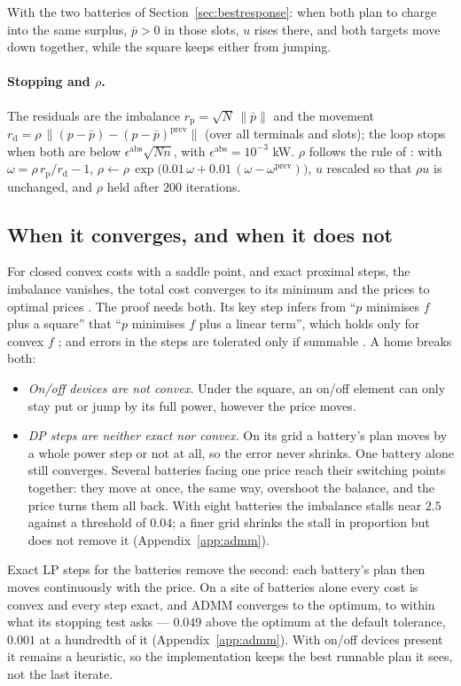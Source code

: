 \documentclass[11pt,a4paper]{article}
\begin{document}
With the two batteries of Section~\ref{sec:bestresponse}: when both plan to
charge into the same surplus, $\bar p > 0$ in those slots, $u$ rises there, and
both targets move down together, while the square keeps either from jumping.

\paragraph{Stopping and $\rho$.} The residuals are the imbalance
$r_{\mathrm p} = \sqrt N\,\|\bar p\|$ and the movement
$r_{\mathrm d} = \rho\,\|(p - \bar p) - (p - \bar p)^{\mathrm{prev}}\|$ (over all
terminals and slots); the loop stops when both are below $\epsilon^{\mathrm{abs}}\sqrt{Nn}$,
with $\epsilon^{\mathrm{abs}} = 10^{-3}$ kW.
$\rho$ follows the rule of \cite{kraning2014}: with $\omega = \rho\, r_{\mathrm p}/r_{\mathrm d} - 1$,
$\rho \leftarrow \rho\,\exp\!\big(0.01\,\omega + 0.01\,(\omega -
\omega^{\mathrm{prev}})\big)$, $u$ rescaled so that $\rho u$ is unchanged, and
$\rho$ held after $200$ iterations.

\subsection{When it converges, and when it does not}
\label{sec:convergence}

For closed convex costs with a saddle point, and exact proximal steps, the
imbalance vanishes, the total cost converges to its minimum and the prices to
optimal prices \cite[\S3.2]{boyd2011}. The proof needs both. Its key step infers from ``$p$
minimises $f$ plus a square'' that ``$p$ minimises $f$ plus a linear term'',
which holds only for convex $f$ \cite[App.~A]{boyd2011}; and errors in the steps
are tolerated only if summable \cite[\S3.4.4]{boyd2011}. A home breaks both:
\begin{itemize}[leftmargin=*,itemsep=2pt]
\item \emph{On/off devices are not convex.} Under the square, an on/off element
  can only stay put or jump by its full power, however the price moves.
\item \emph{DP steps are neither exact nor convex.} On its grid a battery's plan
  moves by a whole power step or not at all, so the error never shrinks. One
  battery alone still converges. Several batteries facing one price reach their
  switching points together: they move at once, the same way, overshoot the
  balance, and the price turns them all back. With eight batteries the imbalance
  stalls near $2.5$ against a threshold of $0.04$; a finer grid shrinks the
  stall in proportion but does not remove it (Appendix~\ref{app:admm}).
\end{itemize}
Exact LP steps for the batteries remove the second: each battery's plan then
moves continuously with the price. On a site of batteries alone every cost is
convex and every step exact, and ADMM converges to the optimum, to within what
its stopping test asks --- $0.049$ above the optimum at the default tolerance,
$0.001$ at a hundredth of it (Appendix~\ref{app:admm}). With on/off devices
present it remains a heuristic, so the implementation keeps the best runnable
plan it sees, not the last iterate.
\end{document}
